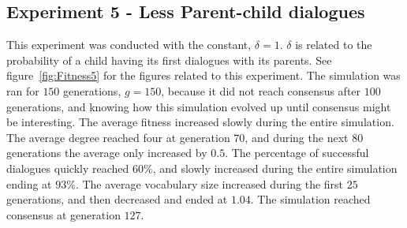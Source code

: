 \subsection{Experiment 5 - Less Parent-child dialogues}
This experiment was conducted with the constant, $\delta = 1$. $\delta$ is related to the probability of a child having its first dialogues with its parents. See figure~\ref{fig:Fitness5} for the figures related to this experiment. The simulation was ran for $150$ generations, $g = 150$, because it did not reach consensus after $100$ generations, and knowing how this simulation evolved up until consensus might be interesting. The average fitness increased slowly during the entire simulation. The average degree reached four at generation $70$, and during the next $80$ generations the average only increased by $0.5$. The percentage of successful dialogues quickly reached $60\%$, and slowly increased during the entire simulation ending at $93\%$. The average vocabulary size increased during the first $25$ generations, and then decreased and ended at $1.04$. The simulation reached consensus at generation $127$.

